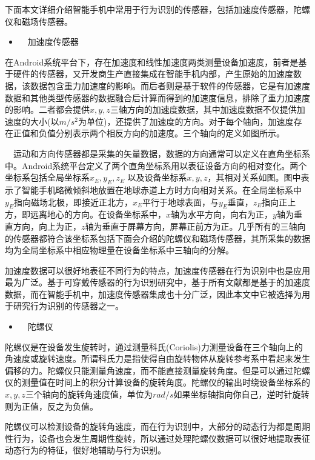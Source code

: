 \par 下面本文详细介绍智能手机中常用于行为识别的传感器，包括加速度传感器，陀螺仪和磁场传感器。
\begin{itemize}
	\item　加速度传感器
\end{itemize}
\par 在Android系统平台下，存在加速度和线性加速度两类测量设备加速度，前者是基于硬件的传感器，又开发商生产直接集成在智能手机内部，产生原始的加速度数据，该数据包含重力加速度的影响。而后者则是基于软件的传感器，它是有加速度数据和其他类型传感器的数据融合后计算而得到的加速度信息，排除了重力加速度的影响。二者都会提供$x,  y,  z$三轴方向的加速度数据，其中加速度数据不仅提供加速度的大小(以$m/s^2$为单位)，还提供了加速度的方向。对于每个轴向，加速度存在正值和负值分别表示两个相反方向的加速度。三个轴向的定义如图所示。

\par　运动和方向传感器都是采集的矢量数据，数据的方向通常可以定义在直角坐标系中。Android系统平台定义了两个直角坐标系用以表征设备方向的相对变化。两个坐标系包括全局坐标系$x_E,  y_E,  z_E$ 以及设备坐标系$x,  y,  z$，其相对关系如图。图中表示了智能手机略微倾斜地放置在地球赤道上方时方向相对关系。在全局坐标系中$y_E$指向磁场北极，即接近正北方，$x_E$平行于地球表面，与$y_E$垂直，$z_E$指向正上方，即远离地心的方向。在设备坐标系中，$x$轴为水平方向，向右为正，$y$轴为垂直方向，向上为正，$z$轴为垂直于屏幕方向，屏幕正前方为正。几乎所有的三轴向的传感器都符合该坐标系包括下面会介绍的陀螺仪和磁场传感器，其所采集的数据均为全局坐标系中相应物理量在设备坐标系中三轴向的分解。
\par 加速度数据可以很好地表征不同行为的特点，加速度传感器在行为识别中也是应用最为广泛。基于可穿戴传感器的行为识别研究中，基于所有文献都是基于的加速度数据，而在智能手机中，加速度传感器集成也十分广泛，因此本文中它被选择为用于研究行为识别的传感器之一。

\begin{itemize}
	\item　陀螺仪
\end{itemize}
\par 陀螺仪是在设备发生旋转时，通过测量科氏(Coriolis)力测量设备在三个轴向上的角速度或旋转速度。所谓科氏力是指使得自由旋转物体从旋转参考系中看起来发生偏移的力。陀螺仪只能测量角速度，而不能直接测量旋转角度。但是可以通过陀螺仪的测量值在时间上的积分计算设备的旋转角度。陀螺仪的输出时绕设备坐标系的$x,  y,  z$三个轴向的旋转角速度值，单位为$rad/s$如果坐标轴指向你自己，逆时针旋转则为正值，反之为负值。
\par 陀螺仪可以检测设备的旋转角速度，而在行为识别中，大部分的动态行为都是周期性行为，设备也会发生周期性旋转，所以通过处理陀螺仪数据可以很好地提取表征动态行为的特征，很好地辅助与行为识别。


